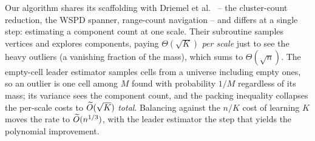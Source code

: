 Our algorithm shares its scaffolding with Driemel et al.~\cite{DMOSW25} -- the cluster-count reduction, the
WSPD spanner, range-count navigation -- and differs at a single step: estimating a component count at one
scale. Their subroutine samples vertices and explores components, paying $\Theta(\sqrt K)$ \emph{per scale}
just to see the heavy outliers (a vanishing fraction of the mass), which sums to $\Theta(\sqrt n)$. The
empty-cell leader estimator samples cells from a universe including empty ones, so an outlier is one cell
among $M$ found with probability $1/M$ regardless of its mass; its variance sees the component count, and
the packing inequality collapses the per-scale costs to $\widetilde{O}(\sqrt K)$ \emph{total}. Balancing against
the $n/K$ cost of learning $K$ moves the rate to $\widetilde{O}(n^{1/3})$, with the leader estimator the step that
yields the polynomial improvement.
